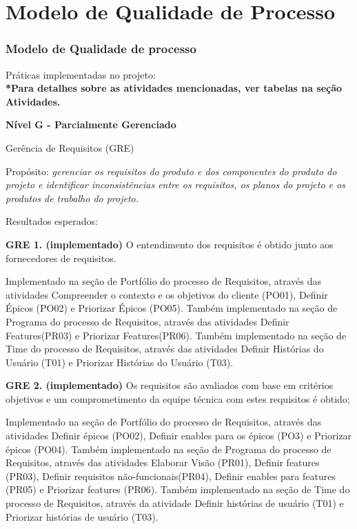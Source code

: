 \chapter[Modelo de Qualidade de Processo]{Modelo de Qualidade de Processo}
{\large {\subsection { Modelo de Qualidade de processo \\ } } }
{\large Práticas implementadas no projeto:\\}
{\footnotesize {\textbf { *Para detalhes sobre as atividades mencionadas, ver tabelas na seção Atividades. \\ }}}

\begin {enumerate}
{\item {\large \textbf{Nível G - Parcialmente Gerenciado \\}}}

\begin  {itemize}
{\item {Gerência de Requisitos (GRE)}}

{\tab Propósito: \textit{gerenciar os requisitos do produto e dos componentes do produto do projeto e identificar inconsistências entre os requisitos, os planos do projeto e os produtos de trabalho do projeto.\\}}

{Resultados esperados:\\}

{\item \textbf{GRE 1. (implementado)} O entendimento dos requisitos é obtido junto aos fornecedores de requisitos.}

Implementado na seção de Portfólio do processo de Requisitos, através das atividades Compreender o contexto e os objetivos do cliente (PO01), Definir Épicos (PO02) e Priorizar Épicos (PO05).
Também implementado na seção de Programa do processo de Requisitos, através das atividades Definir Features(PR03) e Priorizar Features(PR06).
Também implementado na seção de Time do processo de Requisitos, através das atividades Definir Histórias do Usuário (T01) e Priorizar Histórias do Usuário (T03).


{\item \textbf{GRE 2. (implementado)} Os requisitos são avaliados com base em critérios objetivos e um comprometimento da equipe técnica com estes requisitos é obtido;}

Implementado na seção de Portfólio do processo de Requisitos, através das atividades Definir épicos (PO02), Definir enables para os épicos (PO3) e Priorizar épicos (PO04).
Também implementado na seção de Programa do processo de Requisitos, através das atividades Elaborar Visão (PR01), Definir features (PR03), Definir requisitos não-funcionais(PR04), Definir enables para features (PR05) e Priorizar features (PR06).
Também implementado na seção de Time do processo de Requisitos, através da atividade Definir histórias de usuário (T01) e Priorizar histórias de usuário (T03).


\end{itemize}
\end{enumerate}
